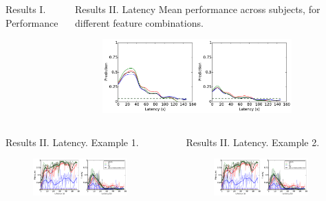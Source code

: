 \documentclass[final,t,overlay, xcolor=table, sans, mathserif]{beamer}
\begin{document}
\begin{frame}{}
\begin{columns}[t]
\begin{column}{.65\linewidth}
\begin{columns}
\begin{block}{Results I. Performance}
\begin{columns}
\begin{figure}
\end{figure}
\end{columns}
\end{block}
\begin{block}{Results II. Latency}
\centering
Mean performance across subjects, for different feature combinations.
\begin{figure}
\includegraphics[width=0.85\textwidth]{figures/all_latency.pdf}
\end{figure}
\end{block}
\end{columns}

\begin{columns}
\begin{block}{Results II. Latency. Example 1.}
\begin{figure}
\includegraphics[width=0.85\textwidth]{figures/Patient_2_latency.pdf}
\end{figure}
\end{block}
\begin{block}{Results II. Latency. Example 2.}
\begin{figure}
\includegraphics[width=0.85\textwidth]{figures/Patient_2_latency.pdf}
\end{figure}
\end{block}
\end{columns}




\end{column}
\end{columns}
\end{frame}
\end{document}
